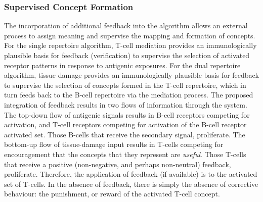 \subsubsection{Supervised Concept Formation}
The incorporation of additional feedback into the algorithm allows an external process to assign meaning and supervise the mapping and formation of concepts. For the single repertoire algorithm, T-cell mediation provides an immunologically plausible basis for feedback (verification) to supervise the selection of activated receptor patterns in response to antigenic exposures. For the dual repertoire algorithm, tissue damage provides an immunologically plausible basis for feedback to supervise the selection of concepts formed in the T-cell repertoire, which in turn feeds back to the B-cell repertoire via the mediation process. The proposed integration of feedback results in two flows of information through the system. The top-down flow of antigenic signals results in B-cell receptors competing for activation, and T-cell receptors competing for activation of the B-cell receptor activated set. Those B-cells that receive the secondary signal, proliferate. The bottom-up flow of tissue-damage input results in T-cells competing for encouragement that the concepts that they represent are \emph{useful}. Those T-cells that receive a positive (non-negative, and perhaps non-neutral) feedback, proliferate. Therefore, the application of feedback (if available) is to the activated set of T-cells. In the absence of feedback, there is simply the absence of corrective behaviour: the punishment, or reward of the activated T-cell concept.


